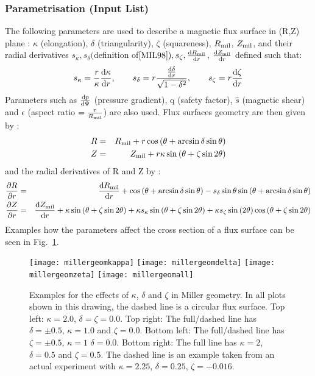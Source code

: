 \subsubsection{Parametrisation (Input List)}
The following parameters are used to describe a magnetic flux surface in (R,Z) plane : $\kappa$ (elongation), $\delta$ (triangularity), $\zeta$ (squareness), $R_{\rm mil}$, $Z_{\rm mil}$, and their radial derivatives $s_\kappa, s_\delta ($definition of$ \cite{MIL98}), s_\zeta, {\mathrm{d} R_{
\rm mil} \over \mathrm{d}r}$, ${\mathrm{d}Z_{\rm mil} \over \mathrm{d}r}$ defined such that:  
\begin{equation}
s_\kappa  =  {r \over \kappa}{\mathrm{d}\kappa \over \mathrm{d}r}, \qquad
s_\delta  =  r{{\mathrm{d}\delta \over \mathrm{d}r} \over \sqrt{1-\delta^2}}, \qquad
s_\zeta  = r{\mathrm{d}\zeta \over \mathrm{d}r}
\end{equation}
Parameters such as ${\mathrm{d} p \over \mathrm{d} \Psi}$ (pressure gradient), q (safety factor), $\hat s$ (magnetic shear) and $\epsilon$ (aspect ratio $= {r \over R_{
\rm mil}}$) are also used.
Flux surfaces geometry are then given by :
\begin{eqnarray}
R &=& R_{\rm mil} + r \cos{(\theta + \arcsin \delta \sin \theta)} \\
Z &=& Z_{\rm mil} + r \kappa \sin{(\theta + \zeta \sin{2\theta})}
\end{eqnarray}
and the radial derivatives of R and Z by :
\begin{eqnarray}
\frac{\partial  R}{\partial r} &=& {\mathrm{d}R_{\rm mil} \over \mathrm{d}r} + \cos{(\theta + \arcsin \delta \sin \theta)} - s_\delta \sin{\theta} \sin{(\theta + \arcsin \delta \sin \theta)} \\
\frac{\partial  Z}{\partial r} &=& {\mathrm{d}Z_{\rm mil} \over \mathrm{d}r} + \kappa \sin{(\theta + \zeta \sin{2\theta})} + \kappa s_\kappa \sin{(\theta + \zeta \sin{2\theta})} + \kappa s_\zeta \sin{(2\theta)} \cos{(\theta + \zeta \sin{2\theta})}
\end{eqnarray}
Examples how the parameters affect the cross section of a flux surface can be
seen in Fig.~\ref{fig:examplemillergeom}.
\begin{figure}
  \begin{center}
    \texttt{[image: millergeomkappa]}
    \texttt{[image: millergeomdelta]}
    \texttt{[image: millergeomzeta]}
    \texttt{[image: millergeomall]}
    \caption[Examples Miller geometry]{\label{fig:examplemillergeom}
    Examples for the effects of $\kappa$, $\delta$ and $\zeta$ in Miller
    geometry. In all plots shown in this drawing, the dashed line is a circular flux surface.
    Top left: $\kappa=2.0$, $\delta=\zeta=0.0$. Top right: The
    full/dashed line has $\delta=\pm 0.5$, $\kappa=1.0$ and $\zeta=0.0$. Bottom
    left: The full/dashed line has $\zeta=\pm 0.5$, $\kappa=1$ $\delta=0.0$.
    Bottom right: The full line has $\kappa=2$, $\delta=0.5$ and $\zeta=0.5$.
    The dashed line is an example taken from an actual experiment
    with $\kappa=2.25$, $\delta=0.25$, $\zeta=-0.016$.}
  \end{center}
\end{figure}
